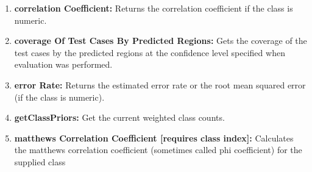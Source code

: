 \documentclass[a4paper,12pt, english]{article}
\begin{document}
\begin{enumerate}
          

          
\item \textbf{correlation Coefficient: }
          Returns the correlation coefficient if the class is numeric.
          
\item \textbf{coverage Of Test Cases By Predicted Regions: }
          Gets the coverage of the test cases by the predicted regions at the confidence level specified when evaluation was performed.
          

          
          
          
\item \textbf{error Rate: }
          Returns the estimated error rate or the root mean squared error (if the class is numeric).

                    

\item \textbf{getClassPriors: }
          Get the current weighted class counts.
          
          
          
          



          
\item \textbf{matthews Correlation Coefficient [requires class index]: }
          Calculates the matthews correlation coefficient (sometimes called phi coefficient) for the supplied class
          


\end{enumerate}
\end{document}
